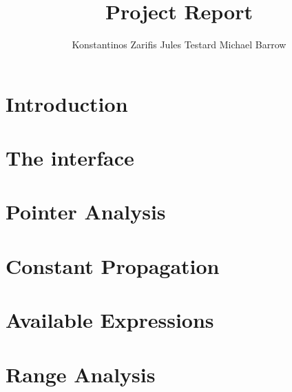 \documentclass[11pt,twocolumn]{article}
\begin{document}
\title{Project Report}
\author{Konstantinos Zarifis \quad Jules Testard \quad Michael Barrow}
\maketitle

\section{Introduction}



\section{The interface}



\section{Pointer Analysis}



\section{Constant Propagation}



\section{Available Expressions}



\section{Range Analysis}


\end{document}
